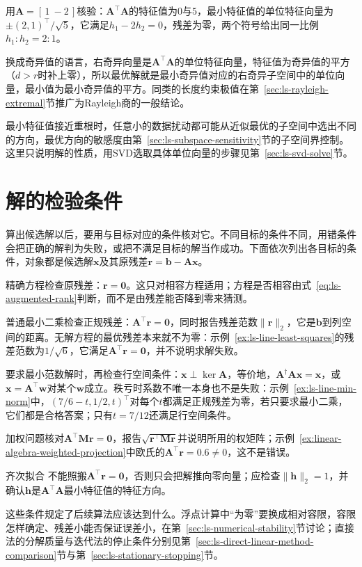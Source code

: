 用$\bm A=[\,1\ -2\,]$核验：$\bm A^\top\bm A$的特征值为$0$与$5$，最小特征值的单位特征向量为$\pm(2,1)^\top/\sqrt5$，它满足$h_1-2h_2=0$，残差为零，两个符号给出同一比例$h_1:h_2=2:1$。

换成奇异值的语言，右奇异向量是$\bm A^\top\bm A$的单位特征向量，特征值为奇异值的平方（$d>r$时补上零），所以最优解就是最小奇异值对应的右奇异子空间中的单位向量，最小值为最小奇异值的平方。同类的长度约束极值在第~\ref{sec:ls-rayleigh-extremal}节推广为Rayleigh商的一般结论。

最小特征值接近重根时，任意小的数据扰动都可能从近似最优的子空间中选出不同的方向，最优方向的敏感度由第~\ref{sec:ls-subspace-sensitivity}节的子空间界控制。这里只说明解的性质，用SVD选取具体单位向量的步骤见第~\ref{sec:ls-svd-solve}节。

\section{解的检验条件}
\label{sec:ls-least-squares-verification}

算出候选解以后，要用与目标对应的条件核对它。不同目标的条件不同，用错条件会把正确的解判为失败，或把不满足目标的解当作成功。下面依次列出各目标的条件，对象都是候选解$\bm x$及其原残差$\bm r=\bm b-\bm A\bm x$。

精确方程检查原残差：$\bm r=\bm0$。这只对相容方程适用；方程是否相容由式~\eqref{eq:ls-augmented-rank}判断，而不是由残差能否降到零来猜测。

普通最小二乘检查正规残差：$\bm A^\top\bm r=\bm0$，同时报告残差范数$\lVert\bm r\rVert_2$，它是$\bm b$到列空间的距离。无解方程的最优残差本来就不为零：示例~\ref{ex:ls-line-least-squares}的残差范数为$1/\sqrt6$，它满足$\bm A^\top\bm r=\bm0$，并不说明求解失败。

要求最小范数解时，再检查行空间条件：$\bm x\perp\ker\bm A$，等价地，$\bm A^\dagger\bm A\bm x=\bm x$，或$\bm x=\bm A^\top\bm w$对某个$\bm w$成立。秩亏时系数不唯一本身也不是失败：示例~\ref{ex:ls-line-min-norm}中，$(7/6-t,1/2,t)^\top$对每个$t$都满足正规残差为零，若只要求最小二乘，它们都是合格答案；只有$t=7/12$还满足行空间条件。

加权问题核对$\bm A^\top\bm M\bm r=\bm0$，报告$\sqrt{\bm r^\top\bm M\bm r}$并说明所用的权矩阵；示例~\ref{ex:linear-algebra-weighted-projection}中欧氏的$\bm A^\top\bm r=0.6\neq0$，这不是错误。

齐次拟合
不能照搬$\bm A^\top\bm r=\bm0$，否则只会把解推向零向量；应检查$\lVert\bm h\rVert_2=1$，并确认$\bm h$是$\bm A^\top\bm A$最小特征值的特征方向。

这些条件规定了后续算法应该达到什么。浮点计算中“为零”要换成相对容限，容限怎样确定、残差小能否保证误差小，在第~\ref{sec:ls-numerical-stability}节讨论；直接法的分解质量与迭代法的停止条件分别见第~\ref{sec:ls-direct-linear-method-comparison}节与第~\ref{sec:ls-stationary-stopping}节。

